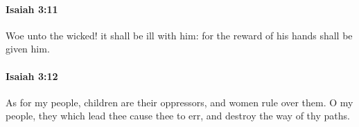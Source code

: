 		\paragraph{Isaiah 3:11} %
			\label{ISAIAH-3-11}

			Woe unto the wicked! it shall be ill with him: for the reward of his hands shall be given him.


		\paragraph{Isaiah 3:12} %
			\label{ISAIAH-3-12}

			As for my people, children are their oppressors, and women rule over them. O my people, they which lead thee cause thee to err, and destroy the way of thy paths.


